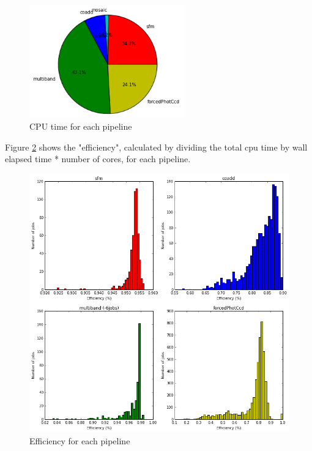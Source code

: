 \documentclass[DM,authoryear,toc]{lsstdoc}
\begin{document}
\begin{figure}[htbp]
        \begin{center}
                 \includegraphics[width=0.6\textwidth]{figures/cpuPieChart}
                 \caption{CPU time for each pipeline}
                 \label{fig:cpuPieChart}
        \end{center}
\end{figure}

Figure \ref{fig:efficiency} shows the "efficiency", calculated by dividing the total cpu time by wall elapsed time * number of cores, for each pipeline.

\begin{figure}[htbp]
        \begin{center}
                 \includegraphics[width=\textwidth]{figures/efficiency}
                 \caption{Efficiency for each pipeline}
                 \label{fig:efficiency}
        \end{center}
\end{figure}
\end{document}
